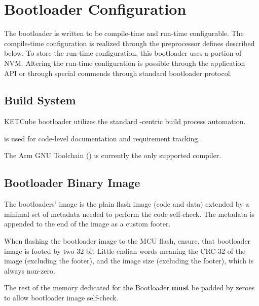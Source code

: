 \clearpage
\section{Bootloader Configuration} \label{sec:settings}

The bootloader is written to be compile-time and run-time configurable. 
The compile-time configuration is realized through the preprocessor defines described below.
To store the run-time configuration, this bootloader uses a portion of NVM.
Altering the run-time configuration is possible through the application API 
or through special commends through standard bootloader protocol.

\subsection{Build System}

KETCube bootloader utilizes the standard -centric build process automation. 

 is used for code-level documentation and requirement tracking.

The Arm GNU Toolchain () is currently the only supported compiler.

\subsection{Bootloader Binary Image}
The bootloaders' image is the plain flash image (code and data) extended by a minimal set of metadata needed to perform the code self-check.
The metadata is appended to the end of the image as a custom footer.

When flashing the bootloader image to the MCU flash, ensure, 
that bootloader image is footed by two 32-bit Little-endian words meaning the CRC-32 of the image (excluding the footer), 
and the image size (excluding the footer), which is always non-zero.

The rest of the memory dedicated for the Bootloader \textbf{must} be padded by zeroes to allow bootloader image self-check.


